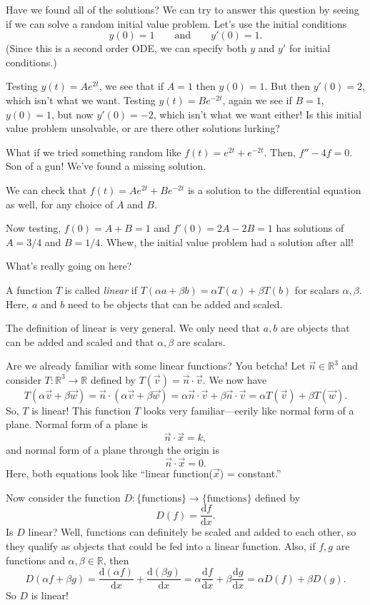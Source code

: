 \documentclass{problemset}
\newcommand{\R}{\mathbb{R}}
\renewcommand{\d}{\mathrm{d}}
\begin{document}
	Have we found all of the solutions?  We can try to answer this question
	by seeing if we can solve a random initial value problem.  Let's use the initial conditions
	\[
		y(0)=1\qquad\text{and}\qquad y'(0)=1.
	\]
	(Since this is a second order ODE, we can specify both $y$ and $y'$ for initial conditions.)

	Testing $y(t)=Ae^{2t}$, we see that if $A=1$ then $y(0)=1$.  But then $y'(0)=2$, which isn't what
	we want.  Testing $y(t)=Be^{-2t}$, again we see if $B=1$, $y(0)=1$, but now $y'(0)=-2$, which isn't
	what we want either!  Is this initial value problem unsolvable, or are there other solutions lurking?

	What if we tried something random like $f(t)=e^{2t}+e^{-2t}$.  Then, $f''-4f=0$. Son of a gun!  
	We've found a missing solution.

	We can check that $f(t)=Ae^{2t}+Be^{-2t}$ is a solution to the differential equation as well,
	for any choice of $A$ and $B$.

	Now testing, $f(0)=A+B=1$ and $f'(0)=2A-2B=1$ has solutions of $A=3/4$ and $B=1/4$.  Whew, the
	initial value problem had a solution after all!

	What's really going on here?

	\begin{definition}[Linear]
		A function $T$ is called \emph{linear} if $T(\alpha a+\beta b)=
		\alpha T(a)+\beta T(b)$ for scalars $\alpha, \beta$.  Here, $a$ and $b$
		need to be objects that can be added and scaled.
	\end{definition}

	The definition of linear is very general.  We only need that $a,b$ are objects
	that can be added and scaled and that $\alpha,\beta$ are scalars.

	Are we already familiar with some linear functions?  You betcha!  Let 
	$\vec n\in\R^3$ and consider
	$T:\R^3\to \R$ defined by $T(\vec v) = \vec n\cdot \vec v$.  We now have
	\[
		T(\alpha \vec v+\beta \vec w)  = \vec n\cdot (\alpha \vec v+\beta \vec w)
		=\alpha\vec n\cdot \vec v + \beta\vec n\cdot \vec v = \alpha T(\vec v)+\beta T(\vec w).
	\]
	So, $T$ is linear!  This function $T$ looks very familiar---eerily like normal
	form of a plane.  Normal form of a plane is
	\[
		\vec n\cdot \vec x=k,
	\]
	and normal form of a plane through the origin is
	\[
		\vec n\cdot \vec x = 0.
	\]
	Here, both equations look like ``linear function($\vec x$) = constant.''


	Now consider the function $D:\{\text{functions}\}\to\{\text{functions}\}$ defined by
	\[
		D(f) = \frac{\d f}{\d x}.
	\]
	Is $D$ linear?  Well, functions can definitely be scaled and added to each other, so they
	qualify as objects that could be fed into a linear function.  Also, if $f,g$ are functions
	and $\alpha,\beta\in\R$,
	then
	\[
		D(\alpha f+\beta g) = \frac{\d (\alpha f)}{\d x}+\frac{\d (\beta g)}{\d x}
		=\alpha\frac{\d f}{\d x}+\beta \frac{\d g}{\d x} = \alpha D(f)+\beta D(g).
	\]
	So $D$ is linear!
\end{document}
